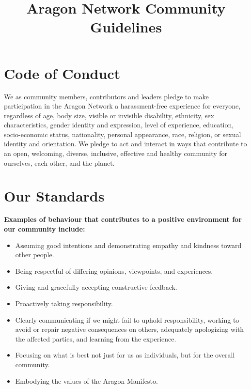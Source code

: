 
\title{Aragon Network Community Guidelines}



\mytitle

\section{Code of Conduct}

We as community members, contributors and leaders pledge to make participation in the Aragon Network a harassment-free experience for everyone, regardless of age, body size, visible or invisible disability, ethnicity, sex characteristics, gender identity and expression, level of experience, education, socio-economic status, nationality, personal appearance, race, religion, or sexual identity and orientation.
We pledge to act and interact in ways that contribute to an open, welcoming, diverse, inclusive, effective and healthy community for ourselves, each other, and the planet.


\section{Our Standards}
\label{sec:OurStandards}

\textbf{Examples of behaviour that contributes to a positive environment for our community include:}
\begin{itemize}
	\item Assuming good intentions and demonstrating empathy and kindness toward other people. 
	\item Being respectful of differing opinions, viewpoints, and experiences.
	\item Giving and gracefully accepting constructive feedback.
	\item Proactively taking responsibility.
	\item Clearly communicating if we might fail to uphold responsibility, working to avoid or repair negative consequences on others, adequately apologizing with the affected parties, and learning from the experience.
	\item Focusing on what is best not just for us as individuals, but for the overall community.
	\item Embodying the values of the Aragon Manifesto.
\end{itemize}
	
